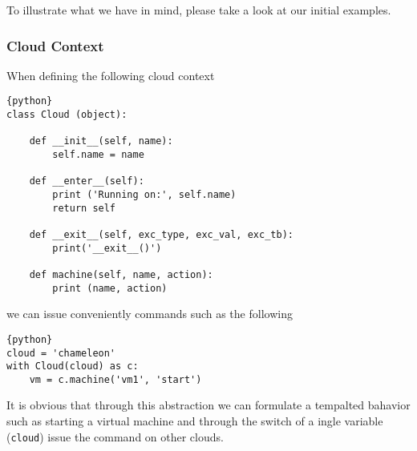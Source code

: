 To illustrate what we have in mind, please take a look at our initial
examples.

\subsubsection{Cloud Context}

When defining the following cloud context 

\begin{lstlisting}{python}
class Cloud (object):
    
    def __init__(self, name):
        self.name = name

    def __enter__(self):
        print ('Running on:', self.name)
        return self

    def __exit__(self, exc_type, exc_val, exc_tb):
        print('__exit__()')

    def machine(self, name, action):
        print (name, action)
\end{lstlisting}

we can issue conveniently commands such as the following 

\begin{lstlisting}{python}
cloud = 'chameleon'
with Cloud(cloud) as c:
    vm = c.machine('vm1', 'start')
\end{lstlisting}

It is obvious that through this abstraction we can formulate a
tempalted bahavior such as starting a virtual machine and through the
switch of a ingle variable (\verb|cloud|) issue the command on other
clouds.


